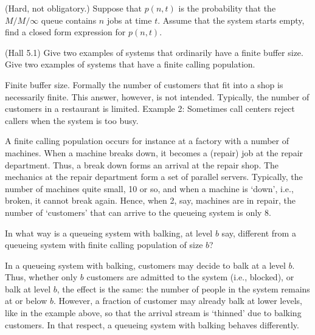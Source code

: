 \begin{question}[use=false]
  (Hard, not obligatory.)  Suppose that $p(n,t)$ is the probability
  that the $M/M/\infty$ queue contains $n$ jobs at time $t$. Assume
  that the system starts empty, find a closed form expression for
  $p(n,t)$. 
\begin{solution}\TBD
 \end{solution}
\end{question}


\begin{question}(Hall 5.1) Give two examples of systems that
  ordinarily have a finite buffer size. Give two examples of systems
  that have a finite calling population.
  \begin{solution}
Finite buffer size. Formally the number of customers that fit into a
shop is necessarily finite. This answer, however, is not
intended. Typically, the number of customers in a restaurant is
limited. Example 2: Sometimes call centers reject callers when the system is too busy.

A finite calling population occurs for instance at a factory with a
number of machines. When a machine breaks down, it becomes a (repair)
job at the repair department.  Thus, a break down forms an arrival at
the repair shop.  The mechanics at the repair department form a set of
parallel servers. Typically, the number of machines quite small, 10 or
so, and when a machine is `down', i.e., broken, it cannot break again.
Hence, when 2, say, machines are in repair, the number of `customers'
that can arrive to the queueing system is only 8. 
  \end{solution}
\end{question}

\begin{question}
 In what way is a queueing system with balking, at level $b$
    say, different from a queueing system with finite calling
    population of size $b$? 
\begin{solution}
 In a queueing system with balking, customers may decide to
    balk at a level $b$. Thus, whether only $b$ customers are admitted
    to the system (i.e., blocked), or balk at level $b$, the effect is
    the same: the number of people in the system remains at or below
    $b$. However, a fraction of customer may already balk at lower
    levels, like in the example above, so that the arrival stream is
    `thinned' due to balking customers. In that respect, a queueing
    system with balking behaves differently.
\end{solution}
\end{question}




